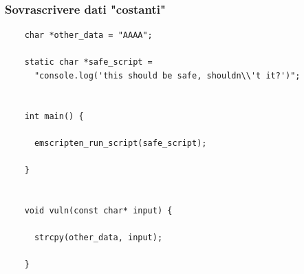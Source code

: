 \documentclass{beamer}
\newcommand\Fontvi{\fontsize{9.5}{7.2}\selectfont}
\begin{document}
\begin{frame}[fragile]
  \frametitle{Sovrascrivere dati "costanti"}
  \Fontvi
  \begin{verbatim}
    char *other_data = "AAAA";

    static char *safe_script = 
      "console.log('this should be safe, shouldn\\'t it?')";


    int main() {
       
      emscripten_run_script(safe_script);
    
    }


    void vuln(const char* input) {
    
      strcpy(other_data, input);

    }
  \end{verbatim}
\end{frame}
\end{document}
